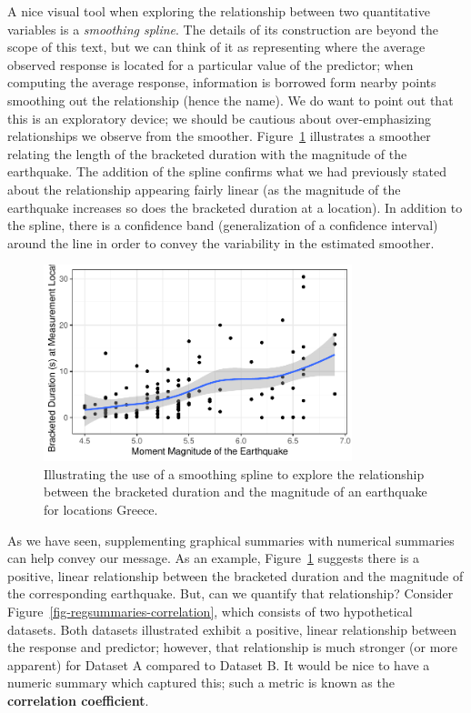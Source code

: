\documentclass[
  letterpaper,
  DIV=11,
  numbers=noendperiod]{scrreprt}
\theoremstyle{definition}
\theoremstyle{definition}
\theoremstyle{plain}
\theoremstyle{remark}
\begin{document}
A nice visual tool when exploring the relationship between two
quantitative variables is a \emph{smoothing spline}. The details of its
construction are beyond the scope of this text, but we can think of it
as representing where the average observed response is located for a
particular value of the predictor; when computing the average response,
information is borrowed form nearby points smoothing out the
relationship (hence the name). We do want to point out that this is an
exploratory device; we should be cautious about over-emphasizing
relationships we observe from the smoother.
Figure~\ref{fig-regsummaries-spline} illustrates a smoother relating the
length of the bracketed duration with the magnitude of the earthquake.
The addition of the spline confirms what we had previously stated about
the relationship appearing fairly linear (as the magnitude of the
earthquake increases so does the bracketed duration at a location). In
addition to the spline, there is a confidence band (generalization of a
confidence interval) around the line in order to convey the variability
in the estimated smoother.

\begin{figure}

{\centering \includegraphics[width=0.8\textwidth,height=\textheight]{./images/fig-regsummaries-spline-1.pdf}

}

\caption{\label{fig-regsummaries-spline}Illustrating the use of a
smoothing spline to explore the relationship between the bracketed
duration and the magnitude of an earthquake for locations Greece.}

\end{figure}

As we have seen, supplementing graphical summaries with numerical
summaries can help convey our message. As an example,
Figure~\ref{fig-regsummaries-spline} suggests there is a positive,
linear relationship between the bracketed duration and the magnitude of
the corresponding earthquake. But, can we quantify that relationship?
Consider Figure~\ref{fig-regsummaries-correlation}, which consists of
two hypothetical datasets. Both datasets illustrated exhibit a positive,
linear relationship between the response and predictor; however, that
relationship is much stronger (or more apparent) for Dataset A compared
to Dataset B. It would be nice to have a numeric summary which captured
this; such a metric is known as the \textbf{correlation coefficient}.
\end{document}
